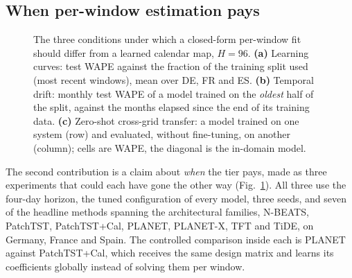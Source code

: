 \subsection{When per-window estimation pays}
\label{sec:mech}
\begin{figure}[!t]
\centering
{}
\caption{The three conditions under which a closed-form per-window fit should differ from a
learned calendar map, $H=96$. \textbf{(a)} Learning curves: test WAPE against the fraction of
the training split used (most recent windows), mean over DE, FR and ES. \textbf{(b)} Temporal
drift: monthly test WAPE of a model trained on the \emph{oldest} half of the split, against
the months elapsed since the end of its training data. \textbf{(c)} Zero-shot cross-grid
transfer: a model trained on one system (row) and evaluated, without fine-tuning, on another
(column); cells are WAPE, the diagonal is the in-domain model.}
\label{fig:mech}
\end{figure}

The second contribution is a claim about \emph{when} the tier pays, made as three experiments
that could each have gone the other way (Fig.~\ref{fig:mech}). All three use the four-day
horizon, the tuned configuration of every model, three seeds, and seven of the headline
methods spanning the architectural families, N-BEATS, PatchTST, PatchTST+Cal, PLANET,
PLANET-X, TFT and TiDE, on Germany, France and Spain. The controlled comparison inside each is
PLANET against PatchTST+Cal, which receives the same design matrix and learns its coefficients
globally instead of solving them per window.

